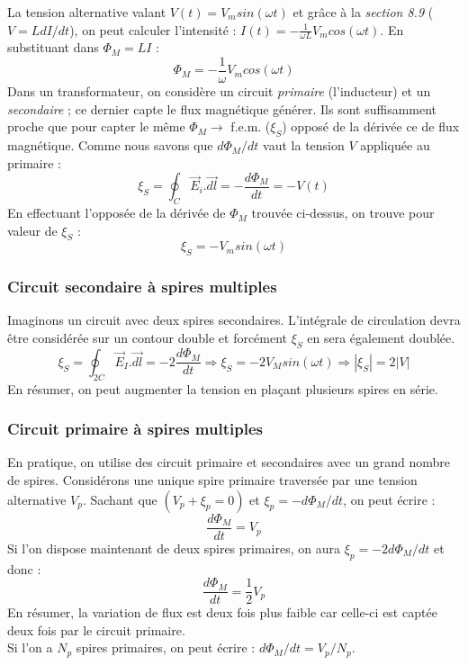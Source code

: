 \documentclass	[11pt, a4paper, openany]{book}
\begin{document}
La tension alternative valant $V(t) = V_m sin(\omega t)$ et grâce à la \textit{section 8.9} ($V = LdI / dt$), on peut calculer l'intensité : $I(t) = -\frac{1}{\omega L}V_m cos(\omega t)$. En substituant dans $\Phi_M = LI$ :
\begin{equation}
\Phi_M = -\frac{1}{\omega}V_m cos(\omega t)
\end{equation}
Dans un transformateur, on considère un circuit \textit{primaire} (l'inducteur) et un \textit{secondaire} ; ce dernier capte le flux magnétique générer. Ils sont suffisamment proche que pour capter le même $\Phi_M \rightarrow$ f.e.m. ($\xi_S$) opposé de la dérivée ce de flux magnétique. Comme nous savons que $d\Phi_M/dt$ vaut la tension $V$ appliquée au primaire : 
\begin{equation}
\xi_S = \oint_C \vec{E}_i.\vec{dl} = - \frac{d\Phi_M}{dt} = - V(t)
\end{equation}
En effectuant l'opposée de la dérivée de $\Phi_M$ trouvée ci-dessus, on trouve pour valeur de $\xi_S$ :
\begin{equation}
\xi_S = - V_m sin(\omega t)
\end{equation}

\subsubsection{Circuit secondaire à spires multiples}
Imaginons un circuit avec deux spires secondaires. L'intégrale de circulation devra être considérée sur un contour double et forcément $\xi_S$ en sera également doublée.
\begin{equation}
\xi_S = \oint_{2C} \vec{E}_I.\vec{dl} = -2\frac{d\Phi_M}{dt} \Rightarrow \xi_S = -2V_M sin(\omega t) \Rightarrow |\xi_S| = 2|V|
\end{equation}
En résumer, on peut augmenter la tension en plaçant plusieurs spires en série.

\subsubsection{Circuit primaire à spires multiples}
En pratique, on utilise des circuit primaire et secondaires avec un grand nombre de spires. Considérons une unique spire primaire traversée par une tension alternative $V_p$. Sachant que $(V_p + \xi_p = 0)$ et $\xi_p = -d\Phi_M/dt$, on peut écrire : 
\begin{equation}
\frac{d\Phi_M}{dt} = V_p
\end{equation}
Si l'on dispose maintenant de deux spires primaires, on aura $\xi_p = -2d\Phi_M/dt$ et donc : 
\begin{equation}
\frac{d\Phi_M}{dt} = \frac{1}{2}V_p
\end{equation}
En résumer, la variation de flux est deux fois plus faible car celle-ci est captée deux fois par le circuit primaire.\\
Si l'on a $N_p$ spires primaires, on peut écrire : $d\Phi_M/dt = V_p/N_p$.\\
\end{document}
